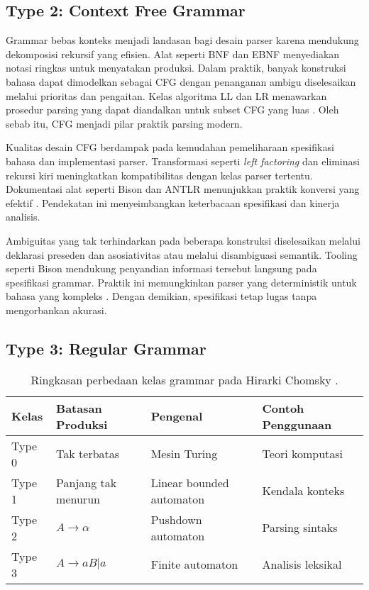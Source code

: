 \documentclass[../main.tex]{subfiles}
\begin{document}
\subsection{Type 2: Context Free Grammar}
Grammar bebas konteks menjadi landasan bagi desain parser karena mendukung dekomposisi rekursif yang efisien. Alat seperti BNF dan EBNF menyediakan notasi ringkas untuk menyatakan produksi. Dalam praktik, banyak konstruksi bahasa dapat dimodelkan sebagai CFG dengan penanganan ambigu diselesaikan melalui prioritas dan pengaitan. Kelas algoritma LL dan LR menawarkan prosedur parsing yang dapat diandalkan untuk subset CFG yang luas \citep{WikiLL,WikiLR}. Oleh sebab itu, CFG menjadi pilar praktik parsing modern.

Kualitas desain CFG berdampak pada kemudahan pemeliharaan spesifikasi bahasa dan implementasi parser. Transformasi seperti \emph{left factoring} dan eliminasi rekursi kiri meningkatkan kompatibilitas dengan kelas parser tertentu. Dokumentasi alat seperti Bison dan ANTLR menunjukkan praktik konversi yang efektif \citep{BisonManual,ANTLRDocs}. Pendekatan ini menyeimbangkan keterbacaan spesifikasi dan kinerja analisis.

Ambiguitas yang tak terhindarkan pada beberapa konstruksi diselesaikan melalui deklarasi preseden dan asosiativitas atau melalui disambiguasi semantik. Tooling seperti Bison mendukung penyandian informasi tersebut langsung pada spesifikasi grammar. Praktik ini memungkinkan parser yang deterministik untuk bahasa yang kompleks \citep{BisonManual}. Dengan demikian, spesifikasi tetap lugas tanpa mengorbankan akurasi.

\subsection{Type 3: Regular Grammar}
\begin{table}[t]
  \centering
  \caption{Ringkasan perbedaan kelas grammar pada Hirarki Chomsky \citep{WikiChomsky}.}
  \label{tab:chomsky}
  \begin{tabular}{@{}llll@{}}
    \toprule
    Kelas & Batasan Produksi & Pengenal & Contoh Penggunaan \\
    \midrule
    Type 0 & Tak terbatas & Mesin Turing & Teori komputasi \\
    Type 1 & Panjang tak menurun & Linear bounded automaton & Kendala konteks \\
    Type 2 & $A \rightarrow \alpha$ & Pushdown automaton & Parsing sintaks \\
    Type 3 & $A \rightarrow aB | a$ & Finite automaton & Analisis leksikal \\
    \bottomrule
  \end{tabular}
\end{table}
\end{document}
